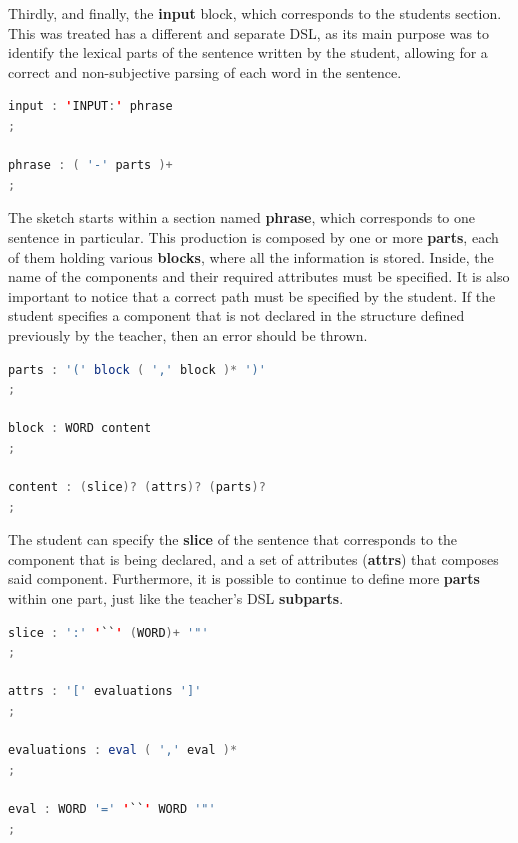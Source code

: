 Thirdly, and finally, the \textbf{input} block, which corresponds to the students section. This was treated has a different and separate \textsc{DSL}, as its main purpose was to identify the lexical parts of the sentence written 
by the student, allowing for a correct and non-subjective parsing of each word in the sentence.

\begin{center}
\begin{minipage}{8cm}
\begin{lstlisting}[language=java, basicstyle=\small, label={lst:dsl_input_prod}, caption=DSL input production]
input : 'INPUT:' phrase 
;

phrase : ( '-' parts )+
;
\end{lstlisting}
\end{minipage}
\end{center}

The sketch starts within a section named \textbf{phrase}, which corresponds to one sentence in particular. 
This production is composed by one or more \textbf{parts}, each of them holding various \textbf{blocks}, where all the information is stored. 
Inside, the name of the components and their required attributes must be specified. 
It is also important to notice that a correct path must be specified by the student. 
If the student specifies a component that is not declared in the structure defined previously by the teacher, then an error should be thrown.

\begin{center}
\begin{minipage}{10cm}
\begin{lstlisting}[language=java, basicstyle=\small, label={lst:dsl_parts_prod}, caption=DSL parts/component/content productions]
parts : '(' block ( ',' block )* ')'
;

block : WORD content
;

content : (slice)? (attrs)? (parts)?
;
\end{lstlisting}
\end{minipage}
\end{center}

The student can specify the \textbf{slice} of the sentence that corresponds to the component that is being declared, and a set of attributes (\textbf{attrs}) that composes said component. Furthermore, it is possible to continue to define more \textbf{parts} within one part, just like the teacher's \textsc{DSL} \textbf{subparts}.

\begin{center}
\begin{minipage}{11cm}
\begin{lstlisting}[language=java, basicstyle=\small, label={lst:dsl_slice_prod}, caption=DSL slice/attrs/evaluations/eval productions]
slice : ':' '``' (WORD)+ '"'
;

attrs : '[' evaluations ']'
;

evaluations : eval ( ',' eval )*
;

eval : WORD '=' '``' WORD '"'
;
\end{lstlisting}
\end{minipage}
\end{center}

